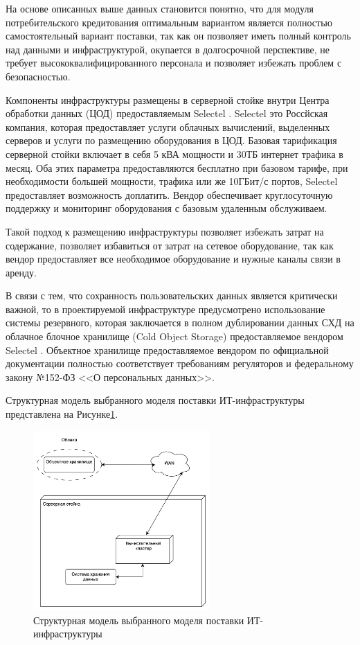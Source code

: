 \documentclass[14pt, a4paper]{extarticle}
\begin{document}
На основе описанных выше данных становится понятно, что для модуля потребительского кредитования
оптимальным вариантом является полностью самостоятельный вариант поставки, так как он позволяет
иметь полный контроль над данными и инфраструктурой, окупается в долгосрочной перспективе, не
требует высококвалифицированного персонала и позволяет избежать проблем с безопасностью.

Компоненты инфраструктуры размещены в серверной стойке внутри
Центра обработки данных (ЦОД) предоставляемым Selectel \cite{selectel-web}.
Selectel это Россйская компания, которая предоставляет услуги облачных вычислений,
выделенных серверов и услуги по размещению оборудования в ЦОД. Базовая тарификация
серверной стойки включает в себя 5 кВА мощности и 30ТБ интернет трафика в месяц.
Оба этих параметра предоставляются бесплатно при базовом тарифе, при необходимости
большей мощности, трафика или же 10ГБит/с портов, Selectel предоставляет возможность
доплатить. Вендор обеспечивает круглосуточную поддержку и мониторинг оборудования с
базовым удаленным обслуживаем.

Такой подход к размещению инфраструктуры позволяет избежать затрат на содержание,
позволяет избавиться от затрат на сетевое оборудование, так как вендор предоставляет
все необходимое оборудование и нужные каналы связи в аренду.

В связи с тем, что сохранность пользовательских данных является критически важной,
то в проектируемой инфраструктуре предусмотрено использование системы резервного,
которая заключается в полном дублировании данных СХД на облачное блочное хранилище
(Cold Object Storage) предоставляемое вендором Selectel \cite{selectel-block-storage}.
Объектное хранилище предоставляемое вендором по официальной документации полностью
соответствует требованиям регуляторов и федеральному закону №152-ФЗ <<О персональных
данных>>.

Структурная модель выбранного моделя поставки ИТ-инфраструктуры представлена на
Рисунке\;\ref{fig:infra1}.

\begin{figure}[H]
  \centering
  \includegraphics[width=0.6\textwidth]{infra1_3.png}
  \caption{Структурная модель выбранного моделя поставки ИТ-инфраструктуры}
  \label{fig:infra1}
\end{figure}
\end{document}
